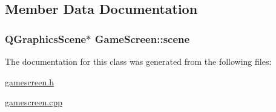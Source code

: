 \subsection{Member Data Documentation}
\hypertarget{class_game_screen_af1416b1a2647d06d0777b863be9c090e}{
\subsubsection[{scene}]{\setlength{\rightskip}{0pt plus 5cm}Q\-Graphics\-Scene$\ast$ Game\-Screen\-::scene}}\label{class_game_screen_af1416b1a2647d06d0777b863be9c090e}


The documentation for this class was generated from the following files\-:\begin{DoxyCompactItemize}
\item 
\hyperlink{gamescreen_8h}{gamescreen.\-h}\item 
\hyperlink{gamescreen_8cpp}{gamescreen.\-cpp}\end{DoxyCompactItemize}
